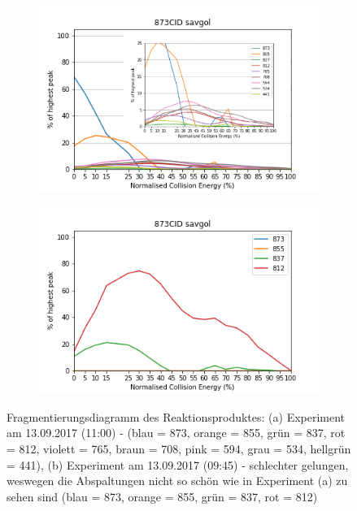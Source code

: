 \begin{figure}[!htbp]
  \begin{subfigure}[b]{\textwidth}
    \centering
    \includegraphics[scale=0.9]{figures/Kapitel4/Kataboliten/diags/873CID-savgol1.png}
    \caption{}
    \label{fig:873MKLeafspraydiags1}
  \end{subfigure}
  \hfill
  \begin{subfigure}[b]{\textwidth}
    \centering
    \includegraphics[scale=0.9]{figures/Kapitel4/Kataboliten/diags/873CID-savgol2.png}
    \caption{}
    \label{fig:873MKstructurediags2}
  \end{subfigure}
  
  \caption[Fragmentierungsdiagramm des Reaktionsproduktes von \textit{Bo}-NCC-1, Quelle: Autor]{Fragmentierungsdiagramm des Reaktionsproduktes: (a) Experiment am 13.09.2017 (11:00) - (blau = 873, orange = 855, grün = 837, rot = 812, violett = 765, braun = 708, pink = 594, grau = 534, hellgrün = 441), (b) Experiment am 13.09.2017 (09:45) - schlechter gelungen, weswegen die Abspaltungen nicht so schön wie in Experiment (a) zu sehen sind (blau = 873, orange = 855, grün = 837, rot = 812)}
\end{figure}